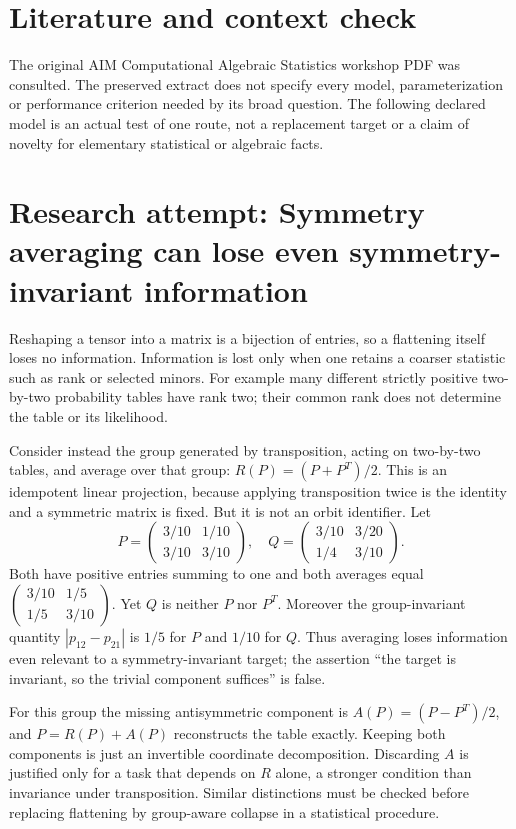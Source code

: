 \documentclass[11pt]{article}
\begin{document}
\section{Literature and context check}
The original AIM Computational Algebraic Statistics
 workshop PDF was consulted. The preserved extract does not specify every model,
 parameterization or performance criterion needed by its broad question. The
 following declared model is an actual test of one route, not a replacement
 target or a claim of novelty for elementary statistical or algebraic facts.
\section{Research attempt: Symmetry averaging can lose even symmetry-invariant information}
Reshaping a tensor into a matrix is a bijection of entries, so a flattening
itself loses no information. Information is lost only when one retains a
coarser statistic such as rank or selected minors. For example many different
strictly positive two-by-two probability tables have rank two; their common
rank does not determine the table or its likelihood.

Consider instead the group generated by transposition, acting on two-by-two
tables, and average over that group: $R(P)=(P+P^T)/2$.
This is an idempotent linear projection, because applying transposition twice
is the identity and a symmetric matrix is fixed. But it is not an orbit
identifier. Let
\[
 P=\begin{pmatrix}3/10&1/10\\3/10&3/10\end{pmatrix},\quad
 Q=\begin{pmatrix}3/10&3/20\\1/4&3/10\end{pmatrix}.
\]
Both have positive entries summing to one and both averages equal
$\left(\begin{smallmatrix}3/10&1/5\\1/5&3/10\end{smallmatrix}\right)$.
Yet $Q$ is neither $P$ nor $P^T$. Moreover the group-invariant quantity
$|p_{12}-p_{21}|$ is $1/5$ for $P$ and $1/10$ for $Q$.
Thus averaging loses information even relevant to a symmetry-invariant target;
the assertion ``the target is invariant, so the trivial component suffices''
is false.

For this group the missing antisymmetric component is
$A(P)=(P-P^T)/2$, and $P=R(P)+A(P)$ reconstructs the table exactly.
Keeping both components is just an invertible coordinate decomposition.
Discarding $A$ is justified only for a task that depends on $R$ alone, a
stronger condition than invariance under transposition. Similar distinctions
must be checked before replacing flattening by group-aware collapse in a
statistical procedure.
\end{document}
